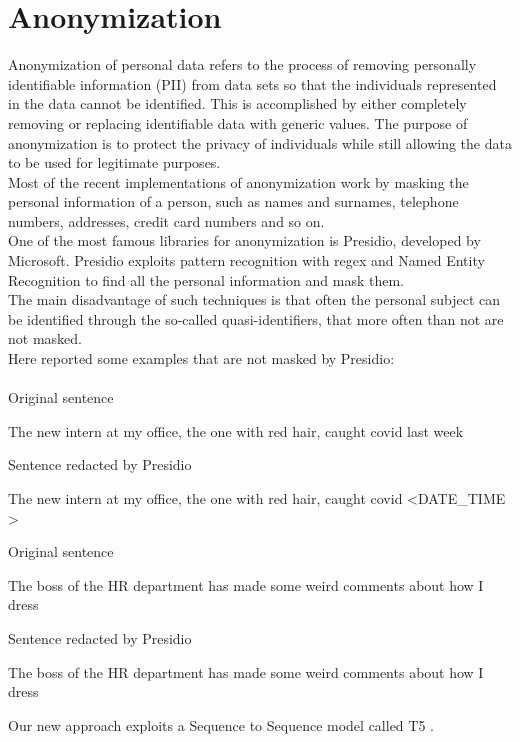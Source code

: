 \clearpage
\section{Anonymization}

Anonymization of personal data refers to the process of removing personally identifiable information (PII) from data sets so that the individuals represented in the data cannot be identified. This is accomplished by either completely removing or replacing identifiable data with generic values. The purpose of anonymization is to protect the privacy of individuals while still allowing the data to be used for legitimate purposes. \\
Most of the recent implementations of anonymization work by masking the personal information of a person, such as names and surnames, telephone numbers, addresses, credit card numbers and so on. \\
One of the most famous libraries for anonymization is Presidio, developed by Microsoft. Presidio exploits pattern recognition with regex and Named Entity Recognition to find all the personal information and mask them. \\
The main disadvantage of such techniques is that often the personal subject can be identified through the so-called quasi-identifiers, that more often than not are not masked.
\\Here reported some examples that are not masked by Presidio:\\ \\
Original sentence
\begin{adjustwidth}{1cm}{}
    The new intern at my office, the one with red hair, caught covid last week 
\end{adjustwidth}
Sentence redacted by Presidio
\begin{adjustwidth}{1cm}{}
    The new intern at my office, the one with red hair, caught covid \textless DATE\_TIME \textgreater
\end{adjustwidth}
Original sentence
\begin{adjustwidth}{1cm}{}
    The boss of the HR department has made some weird comments about how I dress
\end{adjustwidth}
Sentence redacted by Presidio
\begin{adjustwidth}{1cm}{}
    The boss of the HR department has made some weird comments about how I dress 
\end{adjustwidth}
Our new approach exploits a Sequence to Sequence model called T5 .
